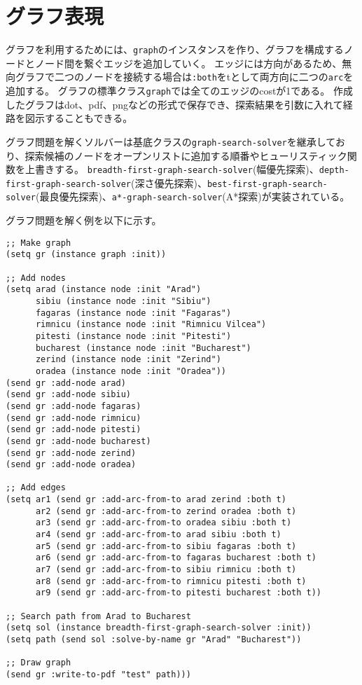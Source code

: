 \section{グラフ表現}
  グラフを利用するためには、\verb|graph|のインスタンスを作り、グラフを構成するノードとノード間を繋ぐエッジを追加していく。
  エッジには方向があるため、無向グラフで二つのノードを接続する場合は\verb|:both|をtとして両方向に二つの\verb|arc|を追加する。
  グラフの標準クラス\verb|graph|では全てのエッジのcostが1である。
  作成したグラフはdot、pdf、pngなどの形式で保存でき、探索結果を引数に入れて経路を図示することもできる。

  グラフ問題を解くソルバーは基底クラスの\verb|graph-search-solver|を継承しており、探索候補のノードをオープンリストに追加する順番やヒューリスティック関数を上書きする。
  \verb|breadth-first-graph-search-solver|(幅優先探索)、\verb|depth-first-graph-search-solver|(深さ優先探索)、\verb|best-first-graph-search-solver|(最良優先探索)、\verb|a*-graph-search-solver|(A*探索)が実装されている。

  グラフ問題を解く例を以下に示す。

  {\baselineskip=10pt
\begin{verbatim}
;; Make graph
(setq gr (instance graph :init))

;; Add nodes
(setq arad (instance node :init "Arad")
      sibiu (instance node :init "Sibiu")
      fagaras (instance node :init "Fagaras")
      rimnicu (instance node :init "Rimnicu Vilcea")
      pitesti (instance node :init "Pitesti")
      bucharest (instance node :init "Bucharest")
      zerind (instance node :init "Zerind")
      oradea (instance node :init "Oradea"))
(send gr :add-node arad)
(send gr :add-node sibiu)
(send gr :add-node fagaras)
(send gr :add-node rimnicu)
(send gr :add-node pitesti)
(send gr :add-node bucharest)
(send gr :add-node zerind)
(send gr :add-node oradea)

;; Add edges
(setq ar1 (send gr :add-arc-from-to arad zerind :both t)
      ar2 (send gr :add-arc-from-to zerind oradea :both t)
      ar3 (send gr :add-arc-from-to oradea sibiu :both t)
      ar4 (send gr :add-arc-from-to arad sibiu :both t)
      ar5 (send gr :add-arc-from-to sibiu fagaras :both t)
      ar6 (send gr :add-arc-from-to fagaras bucharest :both t)
      ar7 (send gr :add-arc-from-to sibiu rimnicu :both t)
      ar8 (send gr :add-arc-from-to rimnicu pitesti :both t)
      ar9 (send gr :add-arc-from-to pitesti bucharest :both t))

;; Search path from Arad to Bucharest
(setq sol (instance breadth-first-graph-search-solver :init))
(setq path (send sol :solve-by-name gr "Arad" "Bucharest"))

;; Draw graph
(send gr :write-to-pdf "test" path)))

\end{verbatim}
}


